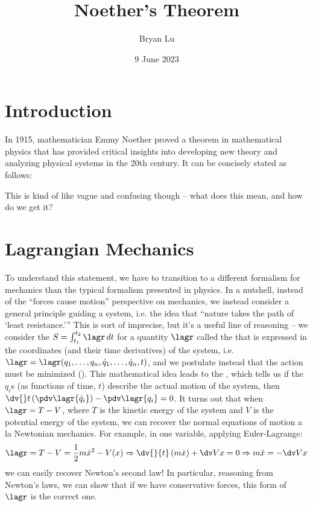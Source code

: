 \documentclass[12pt]{article}
\title{Noether's Theorem}
\author{Bryan Lu}
\date{9 June 2023} %
\begin{document}
\maketitle

\section{Introduction}
In 1915, mathematician Emmy Noether proved a theorem in mathematical
physics that has provided critical insights into developing new theory and 
analyzing physical systems in the 20th century. It can be concisely stated as
follows: 
\begin{center}
\end{center}
This is kind of like vague and confusing though -- what does this mean, and how
do we get it? 

\section{Lagrangian Mechanics}
To understand this statement, we have to transition to a different formalism for
mechanics than the typical formalism presented in physics. In a nutshell,
instead of the ``forces cause motion'' perspective on mechanics, we instead
consider a general principle guiding a system, i.e. the idea that ``nature 
takes the path of `least resistance.''' This is sort of imprecise,
but it's a useful line of reasoning -- we consider the  $S =
\int_{t_1}^{t_2} \lagr \, dt$ for a quantity $\lagr$ called the  that is
expressed in the coordinates (and their time derivatives) of the system, i.e.
$\lagr
= \lagr(q_1, \dots, q_n, \dot q_1, \dots, \dot q_n, t)$, and we postulate instead that
the action must be minimized (). This mathematical
idea leads to the ,
which tells us if the $q_i$s (as functions of time, $t$) describe the actual
motion of the system, then $\dv{}t \left( \pdv \lagr {\dot q_i} \right) - \pdv
\lagr{q_i} = 0$. It turns out that when $\lagr = T - V$, where $T$ is the kinetic
energy of the system and $V$ is the potential energy of the system, we can
recover the normal equations of motion a la Newtonian mechanics. For example, in
one variable, applying Euler-Lagrange: 
\[
  \lagr = T - V = \frac{1}{2} m \dot x ^2 - V(x) \Rightarrow \dv{}{t} \left(
    m \dot x \right) + \dv V x = 0 \Rightarrow m \ddot x = - \dv V x 
\] 
we can easily recover Newton's second law! In particular, reasoning from
Newton's laws, we can show that if we have conservative forces, this form of
$\lagr$ is the correct one. 
\end{document}
